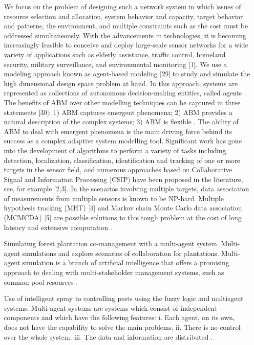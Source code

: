 \documentclass[letterpaper, 10 pt, conference]{ieeeconf}  %
\begin{document}
We focus on the problem of designing such a network system in which issues of resource selection and allocation, system behavior and capacity, target behavior and patterns, the environment, and multiple constraints such as the cost must be addressed simultaneously.
With the advancements in technologies, it is becoming increasingly feasible to conceive and deploy large-scale sensor networks for a wide variety of applications such as elderly assistance, traffic control, homeland security, military surveillance, and environmental monitoring [1].
We use a modeling approach known as agent-based modeling [29] to study and simulate the high dimensional design space problem at hand. In this approach, systems are represented as collections of autonomous decision-making entities, called agents \cite{Li2013}.
The benefits of ABM over other modelling techniques can be captured in three statements [30]: 1) ABM captures emergent phenomena; 2) ABM provides a natural description of the complex systems; 3) ABM is flexible \cite{Li2013}.
The ability of ABM to deal with emergent phenomena is the main driving force behind its success as a complex adaptive system modelling tool. Significant  work  has  gone  into  the  development  of algorithms to perform a variety of tasks including detection, localization,  classification,  identification  and  tracking  of  one  or  more  targets  in the  sensor  field,  and  numerous  approaches  based  on  Collaborative Signal and Information Processing (CSIP) have been proposed in the literature, see, for example [2,3]. In the scenarios involving multiple targets,  data  association  of  measurements  from  multiple  sensors  is known to be NP-hard. Multiple hypothesis tracking (MHT) [4] and Markov  chain  Monte  Carlo  data  association  (MCMCDA)  [5]  are 
possible solutions to this tough problem at the cost of long latency and extensive computation \cite{Li2013}.

Simulating forest plantation co-management with a multi-agent system. Multi-agent simulations and explore scenarios of collaboration for plantations. Multi-agent simulation is a branch of artiﬁcial intelligence that offers a promising approach to dealing with multi-stakeholder management systems, such as common pool resources \cite{Purnomo2006}.

Use of intelligent spray to controlling pests using the fuzzy logic and multiagent systems. Multi-agent systems are systems which consist of independent components and which have the following features: i. Each agent, on its own, does not have the capability to solve the main problems. ii. There is no control over the whole system. iii. The data and information are distributed \cite{Shamshirband2012}.  
\end{document}
